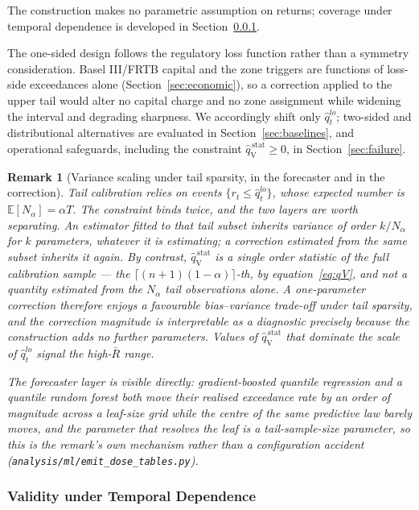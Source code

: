 \documentclass[preprint,11pt,authoryear]{elsarticle}
\newtheorem{remark}[theorem]{Remark}
\newcommand{\E}{\mathbb{E}}
\newcommand{\1}{\boldsymbol{1}}
\newcommand{\qVstat}{\hat{q}_{\scriptscriptstyle\mathrm{V}}^{\,\mathrm{stat}}}
\begin{document}
The construction makes no parametric assumption on returns; coverage under
temporal dependence is developed in Section~\ref{sec:validity}.

The one-sided design follows the regulatory loss function rather than a
symmetry consideration. Basel III/FRTB capital and the zone triggers are
functions of loss-side exceedances alone (Section~\ref{sec:economic}), so a
correction applied to the upper tail would alter no capital charge and no zone
assignment while widening the interval and degrading sharpness. We accordingly
shift only $\hat q_t^{lo}$; two-sided and distributional alternatives are
evaluated in Section~\ref{sec:baselines}, and operational safeguards, including
the constraint $\qVstat \geq 0$, in Section~\ref{sec:failure}.

\begin{remark}[Variance scaling under tail sparsity, in the forecaster and in the correction]
	\label{rem:tail_sparsity}
	Tail calibration relies on events $\{r_t \leq \hat q_t^{lo}\}$, whose expected number is $\E[N_\alpha] = \alpha T$. The constraint binds twice, and the two layers are worth separating. An \emph{estimator} fitted to that tail subset inherits variance of order $k/N_\alpha$ for $k$ parameters, whatever it is estimating; a \emph{correction} estimated from the same subset inherits it again. By contrast, $\qVstat$ is a single order statistic of the full calibration sample --- the $\lceil (n+1)(1-\alpha)\rceil$-th, by equation~\eqref{eq:qV}, and not a quantity estimated from the $N_\alpha$ tail observations alone. A one-parameter correction therefore enjoys a favourable bias--variance trade-off under tail sparsity, and the correction magnitude is interpretable as a diagnostic precisely because the construction adds no further parameters. Values of $\qVstat$ that dominate the scale of $\hat q_t^{lo}$ signal the high-$\bar R$ range.

	The forecaster layer is visible directly: gradient-boosted quantile regression
and a quantile random forest both move their realised exceedance rate by an
order of magnitude across a leaf-size grid while the centre of the same
predictive law barely moves, and the parameter that resolves the leaf is a
tail-sample-size parameter, so this is the remark's own mechanism rather than a
configuration accident (\texttt{analysis/ml/emit\_dose\_tables.py}).
\end{remark}

\subsubsection{Validity under Temporal Dependence}
\label{sec:validity}
\end{document}
